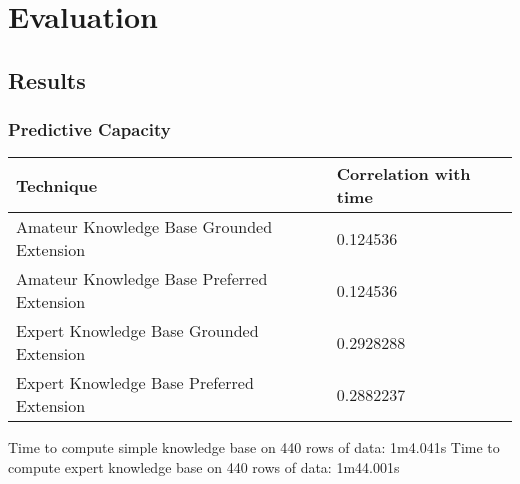 
\chapter{Evaluation} %

\label{Chapter5} %





\section{Results}



\subsection{Predictive Capacity}



\begin{center}
    \begin{tabular}{ | l | l | }
    \hline
    Technique & Correlation with time\\ \hline
    Amateur Knowledge Base Grounded Extension & 0.124536\\ \hline
    Amateur Knowledge Base Preferred Extension & 0.124536\\ \hline
    Expert Knowledge Base Grounded Extension & 0.2928288\\ \hline
    Expert Knowledge Base Preferred Extension & 0.2882237\\ \hline
    \end{tabular}
\end{center}


Time to compute simple knowledge base on 440 rows of data: 1m4.041s
Time to compute expert knowledge base on 440 rows of data: 1m44.001s


